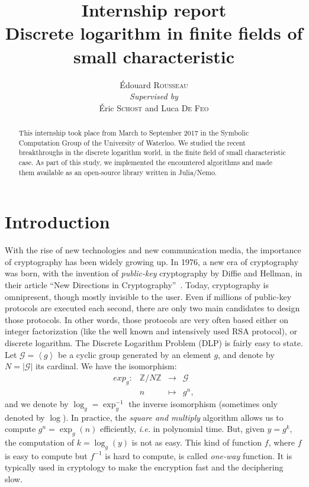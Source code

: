 \documentclass[a4paper,11pt]{article}
\title{Internship report\\\textbf{Discrete logarithm in finite fields of
small characteristic}}
\author{Édouard \textsc{Rousseau}\\\textit{Supervised by}\\Éric \textsc{Schost} and Luca
\textsc{De Feo}}
\theoremstyle{break}
\theoremstyle{sc}
\theoremstyle{definition}
\theoremstyle{remark}
\newcommand{\ie}{\emph{i.e. }}
\begin{document}
\maketitle

\begin{abstract}
This internship took place from March to September 2017 in the Symbolic
Computation Group of the University of Waterloo. We studied the recent
breakthroughs in the discrete logarithm world, in the finite field of small characteristic case.
As part of this study, we implemented the encountered algorithms and made them
available as an open-source library written in Julia/Nemo.
\end{abstract}

\tableofcontents

\clearpage

\section{Introduction}

With the rise of new technologies and new communication media, the importance of
cryptography has been widely growing up. In 1976, a new era of cryptography was
born, with the invention of \emph{public-key} cryptography by Diffie and
Hellman, in their article ``New Directions in Cryptography''~\cite{DH76}. Today,
cryptography is omnipresent, though mostly invisible to the user. Even if
millions of public-key protocols are executed each second, there are only two
main candidates to design those protocols. In other words, those protocols are
very often based either on integer factorization (like the well known
and intensively used RSA protocol), or discrete logarithm. The Discrete
Logarithm Problem (DLP) is fairly easy to state. Let $\mathcal G=\left\langle
g\right\rangle$ be a cyclic group generated by an element
$g$, and denote by $N=|\mathcal G|$ its cardinal. We have the isomorphism:
\[
 \begin{array}{cccc}
   exp_g: & \mathbb{Z}/N\mathbb{Z} & \to & \mathcal G \\
   & n & \mapsto & g^n,
 \end{array}
\]
and we denote by $\log_g=\exp_g^{-1}$ the inverse isomorphism (sometimes only
denoted by $\log$). In practice, the
\emph{square and multiply} algorithm allows us to compute $g^n=\exp_g(n)$
efficiently, \ie in polynomial time. But, given $y = g^k$, the computation of $k
= \log_g(y)$ is not as easy. This kind of function $f$, where $f$ is easy to
compute but $f^{-1}$ is hard to compute, is called \emph{one-way} function.
It is
typically used in cryptology to make the encryption fast and the deciphering
slow. 
\end{document}
